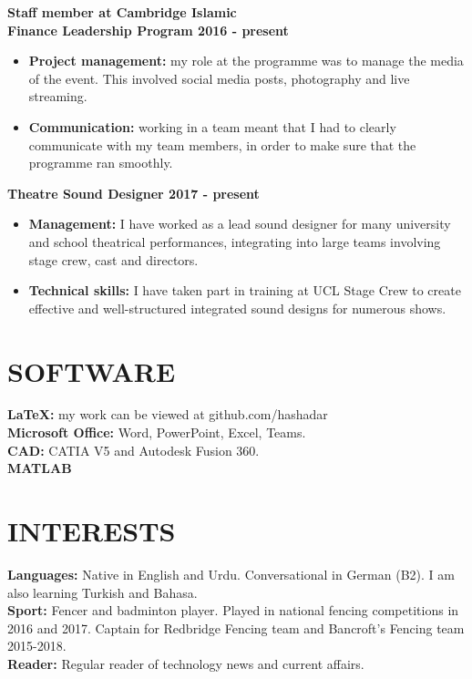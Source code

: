 \documentclass[margin, 10pt]{res} %
\begin{document}
\begin{resume}
\textbf{Staff member at Cambridge Islamic \\ Finance Leadership Program \hfill 2016 - present}
\\
\begin{itemize}
  \item \textbf{Project management:} my role at the programme was to manage the media of the event. This involved social media posts, photography and live streaming. 
  \item \textbf{Communication:} working in a team meant that I had to clearly communicate with my team members, in order to make sure that the programme ran smoothly.
\end{itemize}

\textbf{Theatre Sound Designer \hfill 2017 - present}
\\
\begin{itemize}
  \item \textbf{Management:} I have worked as a lead sound designer for many university and school theatrical performances, integrating into large teams involving stage crew, cast and directors.
  \item \textbf{Technical skills:} I have taken part in training at UCL Stage Crew to create effective and well-structured integrated sound designs for numerous shows.
\end{itemize}


\section{SOFTWARE}
\textbf{LaTeX:} my work can be viewed at github.com/hashadar\\
\textbf{Microsoft Office:} Word, PowerPoint, Excel, Teams.\\
\textbf{CAD:} CATIA V5 and Autodesk Fusion 360.\\
\textbf{MATLAB}\\


\section{INTERESTS} 
\textbf{Languages:} Native in English and Urdu. Conversational in German (B2). I am also learning Turkish and Bahasa.\\ 
\textbf{Sport:} Fencer and badminton player. Played in national fencing competitions in 2016 and 2017. Captain for Redbridge Fencing team and Bancroft's Fencing team 2015-2018.\\
\textbf{Reader:} Regular reader of technology news and current affairs.



\end{resume}
\end{document}
